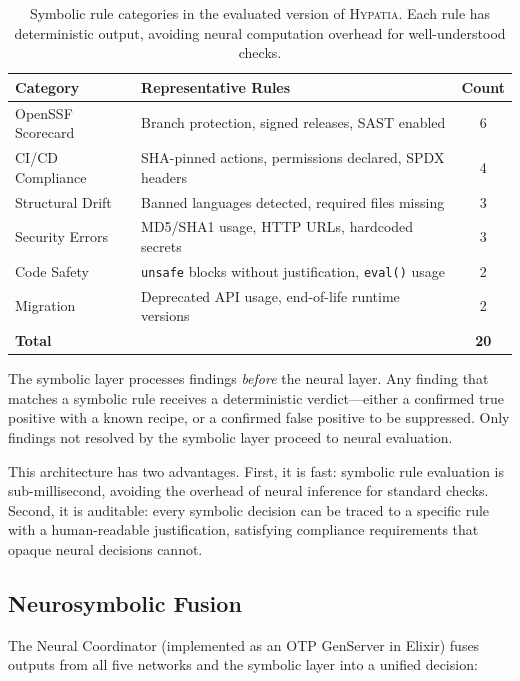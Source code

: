 \documentclass[11pt,a4paper]{article}
\begin{document}
\begin{table}[htbp]
\centering
\caption{Symbolic rule categories in the evaluated version of \textsc{Hypatia}. Each rule has deterministic output, avoiding neural computation overhead for well-understood checks.}
\label{tab:rules}
\begin{tabular}{@{}llc@{}}
\toprule
\textbf{Category} & \textbf{Representative Rules} & \textbf{Count} \\
\midrule
OpenSSF Scorecard & Branch protection, signed releases, SAST enabled & 6 \\
CI/CD Compliance & SHA-pinned actions, permissions declared, SPDX headers & 4 \\
Structural Drift & Banned languages detected, required files missing & 3 \\
Security Errors & MD5/SHA1 usage, HTTP URLs, hardcoded secrets & 3 \\
Code Safety & \texttt{unsafe} blocks without justification, \texttt{eval()} usage & 2 \\
Migration & Deprecated API usage, end-of-life runtime versions & 2 \\
\midrule
\textbf{Total} & & \textbf{20} \\
\bottomrule
\end{tabular}
\end{table}

The symbolic layer processes findings \emph{before} the neural layer. Any finding that matches a symbolic rule receives a deterministic verdict---either a confirmed true positive with a known recipe, or a confirmed false positive to be suppressed. Only findings not resolved by the symbolic layer proceed to neural evaluation.

This architecture has two advantages. First, it is fast: symbolic rule evaluation is sub-millisecond, avoiding the overhead of neural inference for standard checks. Second, it is auditable: every symbolic decision can be traced to a specific rule with a human-readable justification, satisfying compliance requirements that opaque neural decisions cannot.

\subsection{Neurosymbolic Fusion}
\label{subsec:fusion}

The Neural Coordinator (implemented as an OTP GenServer in Elixir) fuses outputs from all five networks and the symbolic layer into a unified decision:
\end{document}
